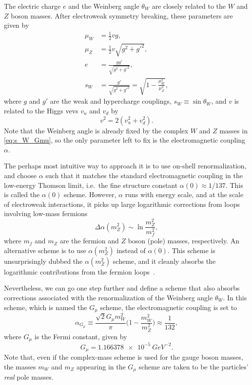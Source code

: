 The electric charge $e$ and the Weinberg angle $\theta_W$ are closely related to the $W$ and $Z$ boson masses.
After electroweak symmetry breaking, these parameters are given by
\begin{subequations}
\begin{align}
    \mu_W &= \frac{1}{2} vg,
    \\
    \mu_Z &= \frac{1}{2} v\sqrt{g^2+g'^2},
    \\
    e &= \frac{gg'}{\sqrt{g^2+g'^2}},
    \\
    s_W &= \frac{g'}{\sqrt{g^2+g'^2}} = \sqrt{1 - \frac{\mu_W^2}{\mu_Z^2}},
    \label{eq:s_W_Gmu}
\end{align}
\end{subequations}
where $g$ and $g'$ are the weak and hypercharge couplings, $s_W\equiv \sin\theta_W$, and $v$ is related to the Higgs \glspl{vev} $v_u$ and $v_d$ by
\begin{equation}
    v^2 = 2(v_u^2+v_d^2).
\end{equation}
Note that the Weinberg angle is already fixed by the complex $W$ and $Z$ masses in \cref{eq:s_W_Gmu}, so the only parameter left to fix is the electromagnetic coupling $\alpha$.

The perhaps most intuitive way to approach it is to use on-shell renormalization, and choose $\alpha$ such that it matches the standard electromagnetic coupling in the low-energy Thomson limit, i.e.\ the fine structure constant $\alpha(0) \approx 1/137$.
This is called the $\alpha(0)$ scheme.
However, $\alpha$ runs with energy scale, and at the scale of electroweak interactions, it picks up large logarithmic corrections from loops involving low-mass fermions~\cite{Denner:2019vbn}
\begin{equation}
    \Delta\alpha(m_Z^2) \sim \ln\frac{m_Z^2}{m_f^2},
\end{equation}
where $m_f$ and $m_Z$ are the fermion and $Z$ boson (pole) masses, respectively.
An alternative scheme is to use $\alpha(m_Z^2)$ instead of $\alpha(0)$. This scheme is unsurprisingly dubbed the $\alpha(m_Z^2)$ scheme, and it cleanly absorbs the logarithmic contributions from the fermion loops~\cite{Denner:2019vbn}.

Nevertheless, we can go one step further and define a scheme that also absorbs corrections associated with the renormalization of the Weinberg angle $\theta_W$.
In this scheme, which is named the $G_\mu$ scheme, the electromagnetic coupling is set to~\cite{Denner:2019vbn}
\begin{equation}
    \alpha_{G_\mu} \equiv \frac{\sqrt{2}G_\mu m_W^2}{\pi} \biggl(1-\frac{m_W^2}{m_Z^2}\biggr) \approx \frac{1}{132},
\end{equation}
where $G_\mu$ is the Fermi constant, given by~\cite{ParticleDataGroup:2026aaa}
\begin{equation}\label{eq:Gmu_in_div}
    G_\mu = \qty{1.166 378e-5}{GeV^{-2}}.
\end{equation}
Note that, even if the complex-mass scheme is used for the gauge boson masses, the masses $m_W$ and $m_Z$ appearing in the $G_\mu$ scheme are taken to be the particles' \emph{real} pole masses.

